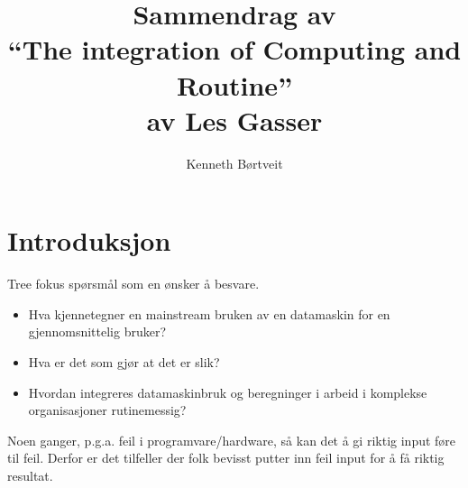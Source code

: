 \documentclass[a4paper, 11pt]{article}
\title{{\Huge Sammendrag av \\ ``The integration of Computing and Routine''} \\  {\small av Les Gasser}}
\author{Kenneth Børtveit}
\begin{document}
\maketitle
\section{Introduksjon}
Tree fokus spørsmål som en ønsker å besvare.
\begin{itemize}
\item Hva kjennetegner en mainstream bruken av en datamaskin for en gjennomsnittelig bruker?
\item Hva er det som gjør at det er slik?
\item Hvordan integreres datamaskinbruk og beregninger i arbeid i komplekse organisasjoner rutinemessig?
\end{itemize}

Noen ganger, p.g.a. feil i programvare/hardware, så kan det å gi riktig input føre til feil. Derfor er det tilfeller der folk bevisst putter inn feil input for å få riktig resultat.
\end{document}
